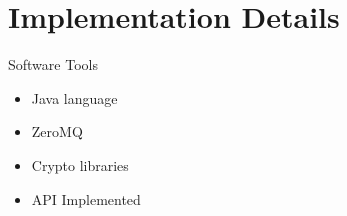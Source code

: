 \section{Implementation Details}

\begin{frame}{Software Tools}
    \begin{itemize}
        \item Java language
        \item ZeroMQ
        \item Crypto libraries
        \item API Implemented
    \end{itemize}
\end{frame}